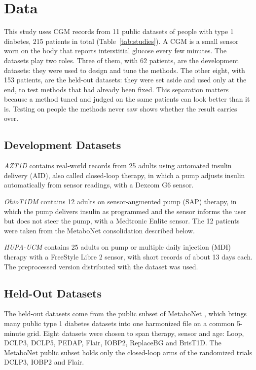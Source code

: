 \section{Data}
\label{sec:data}

This study uses CGM records from 11 public datasets of people with type 1 diabetes, 215 patients in total (Table~\ref{tab:studies}). A CGM is a small sensor worn on the body that reports interstitial glucose every few minutes. The datasets play two roles. Three of them, with 62 patients, are the development datasets: they were used to design and tune the methods. The other eight, with 153 patients, are the held-out datasets: they were set aside and used only at the end, to test methods that had already been fixed. This separation matters because a method tuned and judged on the same patients can look better than it is. Testing on people the methods never saw shows whether the result carries over.

\subsection{Development Datasets}

\textit{AZT1D} \parencite{azt1d2025} contains real-world records from 25 adults using automated insulin delivery (AID), also called closed-loop therapy, in which a pump adjusts insulin automatically from sensor readings, with a Dexcom G6 sensor.

\textit{OhioT1DM} \parencite{marling2020ohio} contains 12 adults on sensor-augmented pump (SAP) therapy, in which the pump delivers insulin as programmed and the sensor informs the user but does not steer the pump, with a Medtronic Enlite sensor. The 12 patients were taken from the MetaboNet consolidation described below.

\textit{HUPA-UCM} \parencite{hupa2024} contains 25 adults on pump or multiple daily injection (MDI) therapy with a FreeStyle Libre 2 sensor, with short records of about 13 days each. The preprocessed version distributed with the dataset was used.

\subsection{Held-Out Datasets}

The held-out datasets come from the public subset of MetaboNet \parencite{metabonet2026}, which brings many public type 1 diabetes datasets into one harmonized file on a common 5-minute grid. Eight datasets were chosen to span therapy, sensor and age: Loop, DCLP3, DCLP5, PEDAP, Flair, IOBP2, ReplaceBG and BrisT1D. The MetaboNet public subset holds only the closed-loop arms of the randomized trials DCLP3, IOBP2 and Flair.

